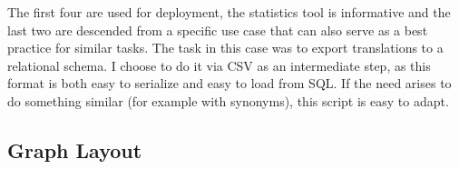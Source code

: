 The first four are used for deployment, the statistics tool is informative and the last two are descended from a specific use case that can also serve as a best practice for similar tasks. The task in this case was to export translations to a relational schema. I choose to do it via CSV as an intermediate step, as this format is both easy to serialize and easy to load from SQL. If the need arises to do something similar (for example with synonyms), this script is easy to adapt.

\subsection{Graph Layout}

\newpage

